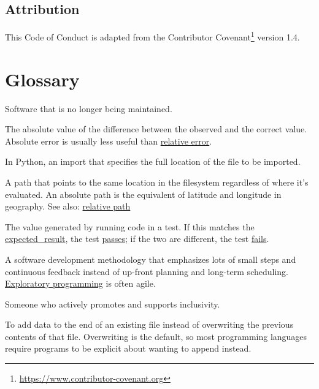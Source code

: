 \documentclass[
]{krantz}
\providecommand{\tightlist}{%
  \setlength{\itemsep}{0pt}\setlength{\parskip}{0pt}}
\renewcommand{\href}[2]{#2\footnote{\url{#1}}}
\begin{document}
\hypertarget{conduct-attribution}{%
\section{Attribution}\label{conduct-attribution}}

This Code of Conduct is adapted from the
\href{https://www.contributor-covenant.org}{Contributor Covenant} version 1.4.

\hypertarget{glossary}{%
\chapter{Glossary}\label{glossary}}

\begin{description}
\tightlist
\item[\textbf{abandonware}]
Software that is no longer being maintained.
\item[\textbf{absolute error}]
The absolute value of the difference between the observed and the correct value. Absolute error is usually less useful than \protect\hyperlink{relative_error}{relative error}.
\item[\textbf{absolute import}]
In Python, an import that specifies the full location of the file to be imported.
\item[\textbf{absolute path}]
A path that points to the same location in the filesystem regardless of where it's evaluated. An absolute path is the equivalent of latitude and longitude in geography. See also: \protect\hyperlink{relative_path}{relative path}
\item[\textbf{actual result (of test)}]
The value generated by running code in a test. If this matches the \protect\hyperlink{expected_result}{expected\_result}, the test \protect\hyperlink{pass_test}{passes}; if the two are different, the test \protect\hyperlink{fail_test}{fails}.
\item[\textbf{agile development}]
A software development methodology that emphasizes lots of small steps and continuous feedback instead of up-front planning and long-term scheduling. \protect\hyperlink{exploratory_programming}{Exploratory programming} is often agile.
\item[\textbf{ally}]
Someone who actively promotes and supports inclusivity.
\item[\textbf{append mode}]
To add data to the end of an existing file instead of overwriting the previous contents of that file. Overwriting is the default, so most programming languages require programs to be explicit about wanting to append instead.

\end{description}
\end{document}
